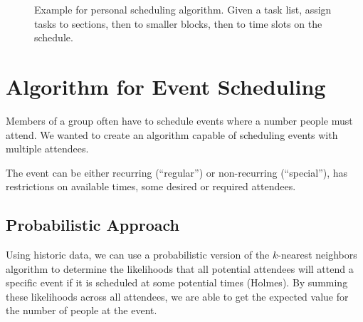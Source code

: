 \documentclass[thesis]{hmcposter}
\begin{document}
\begin{poster}
\begin{figure}
{        }\qquad\qquad
  \caption[Small multiples]{Example for personal scheduling algorithm. Given a task list, assign tasks to sections, then to smaller blocks, then to time slots on the schedule.}%
  \label{fig:small-multiples}
\end{figure}



\section{Algorithm for Event Scheduling}
Members of a group often have to schedule events where a number people must attend.
We wanted to create an algorithm capable of scheduling events with multiple attendees.

The event can be either recurring (``regular'') or non-recurring (``special''), has restrictions on available times, some desired or required attendees.
\subsection{Probabilistic Approach}
Using historic data, we can use a probabilistic version of the $k$-nearest neighbors algorithm to determine the likelihoods that all potential attendees will attend a specific event if it is scheduled at some potential times (Holmes).
By summing these likelihoods across all attendees, we are able to get the expected value for the number of people at the event.


\end{poster}
\end{document}
